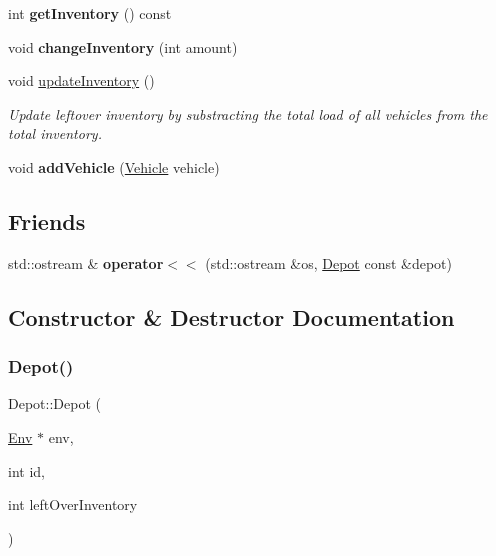 \begin{DoxyCompactItemize}
\mbox{\label{class_depot_ab8d9a6cba5eb3aa4d860e13435dd64df}} 
int {\bfseries get\+Inventory} () const
\item 
\mbox{\label{class_depot_a91c675fef3c934b87f387050c43f2087}} 
void {\bfseries change\+Inventory} (int amount)
\item 
\mbox{\label{class_depot_aad95f075e3df31cfcb7951d4572265f3}} 
void \hyperlink{class_depot_aad95f075e3df31cfcb7951d4572265f3}{update\+Inventory} ()
\begin{DoxyCompactList}\small\item\em Update leftover inventory by substracting the total load of all vehicles from the total inventory. \end{DoxyCompactList}\item 
\mbox{\label{class_depot_a68e6c378cf4527839c67e8e417560744}} 
void {\bfseries add\+Vehicle} (\hyperlink{class_vehicle}{Vehicle} vehicle)
\end{DoxyCompactItemize}
\subsection*{Friends}
\begin{DoxyCompactItemize}
\item 
\mbox{\label{class_depot_a2b64a812d30d31b49205413ae80a159a}} 
std\+::ostream \& {\bfseries operator$<$$<$} (std\+::ostream \&os, \hyperlink{class_depot}{Depot} const \&depot)
\end{DoxyCompactItemize}


\subsection{Constructor \& Destructor Documentation}
\mbox{\label{class_depot_ae5be13d5305f06443d8941be30ca5e71}} 
\subsubsection{\texorpdfstring{Depot()}{Depot()}\hspace{0.1cm}{\footnotesize\ttfamily [1/2]}}
{\footnotesize\ttfamily Depot\+::\+Depot (\begin{DoxyParamCaption}\item[{\hyperlink{class_env}{Env} $\ast$}]{env,  }\item[{int}]{id,  }\item[{int}]{left\+Over\+Inventory }\end{DoxyParamCaption})}



